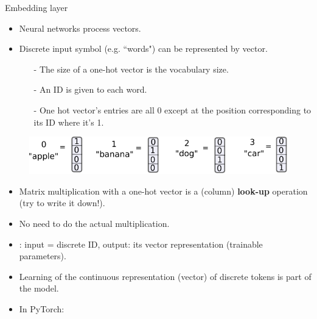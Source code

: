 \begin{frame}{Embedding layer}
\vspace{-5mm}
\begin{itemize}
\item Neural networks process vectors.
\item Discrete input symbol (e.g. ``words") can be represented by  vector.
\begin{itemize}
\item[-] The size of a one-hot vector is the vocabulary size.
\item[-] An ID is given to each word.
\item[-] One hot vector's entries are all 0 except at the position corresponding to its ID where it's 1.
\end{itemize}

\end{itemize}
\begin{figure}
\centering
\includegraphics[width=.7\linewidth]{./figures/emb.pdf}
\end{figure}
\vsp
\begin{itemize}
\item Matrix multiplication with a one-hot vector is a (column) \textbf{look-up} operation (try to write it down!).
\item No need to do the actual multiplication. 
\item {}: input = discrete ID, output: its vector representation (trainable parameters).
\item Learning of the continuous representation (vector) of discrete tokens is part of the model.
\item In PyTorch: 
\end{itemize}
\end{frame}


